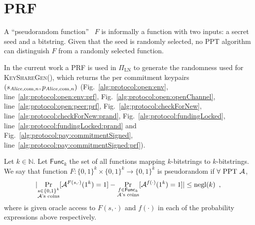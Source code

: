 \section{PRF}
  A ``pseudorandom function''~\cite{katzlindell} $F$ is informally a function
  with two inputs: a secret seed and a bitstring. Given that the seed is
  randomly selected, no PPT algorithm can distinguish $F$ from a randomly
  selected function.

  In the current work a PRF is used in $\Pi_{\mathrm{LN}}$ to generate the
  randomness used for \textsc{KeyShareGen}(), which returns the per commitment
  keypairs $(s_{\mathit{Alice}, \mathrm{com}, n}, p_{\mathit{Alice}, \mathrm{com}, n})$
  (Fig.~\ref{alg:protocol:open:env}, line~\ref{alg:protocol:open:env:prf},
  Fig.~\ref{alg:protocol:open:openChannel},
  line~\ref{alg:protocol:open:peer:prf}, Fig.~\ref{alg:protocol:checkForNew},
  line~\ref{alg:protocol:checkForNew:prand},
  Fig.~\ref{alg:protocol:fundingLocked},
  line~\ref{alg:protocol:fundingLocked:prand} and
  Fig.~\ref{alg:protocol:pay:commitmentSigned},
  line~\ref{alg:protocol:pay:commitmentSigned:prf}).

  \begin{definition}
    Let $k \in \mathbb{N}$. Let $\mathsf{Func}_k$ the set of all functions
    mapping $k$-bitstrings to $k$-bitstrings. We say that function $F: \{0,
    1\}^k \times \{0, 1\}^k \rightarrow \{0, 1\}^k$ is pseudorandom if $\forall
    \text{ PPT } \mathcal{A}$,
    \begin{equation*}
      |\underset{\substack{s \in \{0, 1\}^k \\ \mathcal{A}\text{'s
      coins}}}{\Pr}[\mathcal{A}^{F(s, \cdot)}(1^k) = 1] - \underset{\substack{f
      \in \mathsf{Func}_k \\ \mathcal{A}\text{'s
      coins}}}{\Pr}[\mathcal{A}^{f(\cdot)}(1^k) = 1]| \leq \text{negl}(k) \enspace,
    \end{equation*}
    where \adversary{} is given oracle access to $F(s, \cdot)$ and $f(\cdot)$ in
    each of the probability expressions above respectively.
  \end{definition}
